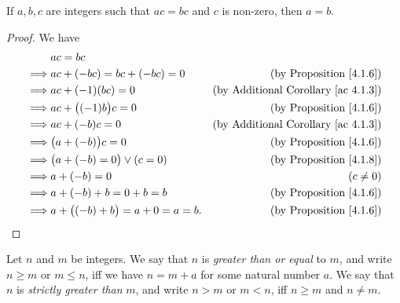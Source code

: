 \begin{corollary}\label{4.1.9}
    If \(a, b, c\) are integers such that \(ac = bc\) and \(c\) is non-zero, then \(a = b\).
\end{corollary}

\begin{proof}
    We have
    \begin{align*}
                 & ac = bc                                                                                   \\
        \implies & ac + (-bc) = bc + (-bc) = 0             & \text{(by Proposition \ref{4.1.6})}             \\
        \implies & ac + (-1)(bc) = 0                       & \text{(by Additional Corollary \ref{ac 4.1.3})} \\
        \implies & ac + \big((-1)b\big)c = 0               & \text{(by Proposition \ref{4.1.6})}             \\
        \implies & ac + (-b)c = 0                          & \text{(by Additional Corollary \ref{ac 4.1.3})} \\
        \implies & \big(a + (-b)\big)c = 0                 & \text{(by Proposition \ref{4.1.6})}             \\
        \implies & \big(a + (-b) = 0\big) \lor (c = 0)     & \text{(by Proposition \ref{4.1.8})}             \\
        \implies & a + (-b) = 0                            & (c \neq 0)                                      \\
        \implies & a + (-b) + b = 0 + b = b                & \text{(by Proposition \ref{4.1.6})}             \\
        \implies & a + \big((-b) + b\big) = a + 0 = a = b. & \text{(by Proposition \ref{4.1.6})}
    \end{align*}
\end{proof}

\begin{definition}\label{4.1.10}
    Let \(n\) and \(m\) be integers.
    We say that \(n\) is \emph{greater than or equal} to \(m\), and write \(n \geq m\) or \(m \leq n\), iff we have \(n = m + a\) for some natural number \(a\).
    We say that \(n\) is \emph{strictly greater than} \(m\), and write \(n > m\) or \(m < n\), iff \(n \geq m\) and \(n \neq m\).
\end{definition}

